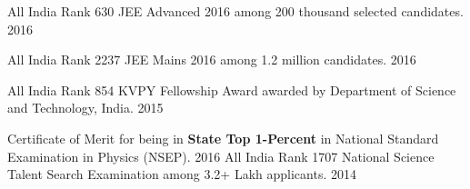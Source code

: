 \begin{cvhonors}
	\cvhonor
		{All India Rank 630}
		{JEE Advanced 2016 among 200 thousand selected candidates.}
		{}
		{2016}

	\cvhonor
		{All India Rank 2237}
		{JEE Mains 2016 among 1.2 million candidates.}
		{}
		{2016}

	\cvhonor
		{All India Rank 854}
		{KVPY Fellowship Award awarded by Department of Science and Technology, India.}
		{}
		{2015}

	\cvhonor
		{Certificate of Merit}{
			for being in \textbf{State Top 1-Percent} in National Standard Examination in Physics (NSEP).
		}
		{}
		{2016}
	\cvhonor
		{All India Rank 1707}
		{National Science Talent Search Examination among 3.2+ Lakh applicants.}
		{}
		{2014}

\end{cvhonors}

